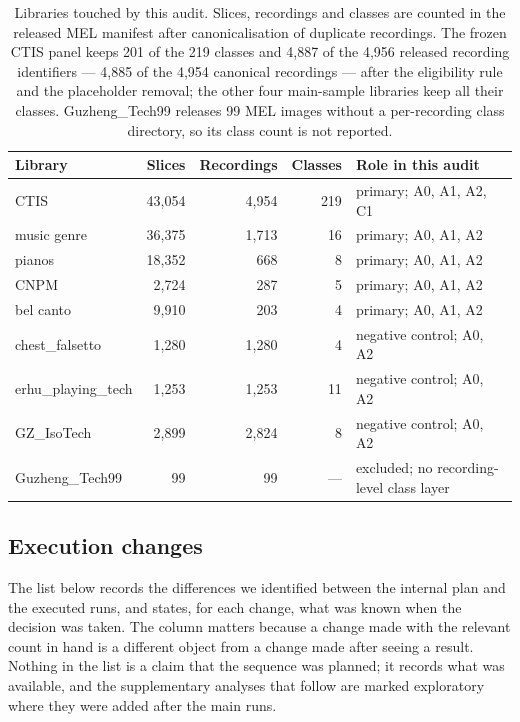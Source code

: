 \begin{table}[ht]\centering\footnotesize\setlength{\tabcolsep}{4pt}
\caption{Libraries touched by this audit. Slices, recordings and classes are counted in the released MEL
manifest after canonicalisation of duplicate recordings. The frozen CTIS panel keeps 201 of the 219
classes and 4{,}887 of the 4{,}956 released recording identifiers --- 4{,}885 of the 4{,}954 canonical
recordings --- after the eligibility rule and the placeholder removal;
the other four main-sample libraries keep all their classes. Guzheng\_Tech99 releases 99 MEL images
without a per-recording class directory, so its class count is not reported.}
\label{tab:libraries}
\begin{tabular}{@{}lrrrl@{}}\toprule
Library & Slices & Recordings & Classes & Role in this audit\\\midrule
CTIS & 43{,}054 & 4{,}954 & 219 & primary; A0, A1, A2, C1\\
music genre & 36{,}375 & 1{,}713 & 16 & primary; A0, A1, A2\\
pianos & 18{,}352 & 668 & 8 & primary; A0, A1, A2\\
CNPM & 2{,}724 & 287 & 5 & primary; A0, A1, A2\\
bel canto & 9{,}910 & 203 & 4 & primary; A0, A1, A2\\
chest\_falsetto & 1{,}280 & 1{,}280 & 4 & negative control; A0, A2\\
erhu\_playing\_tech & 1{,}253 & 1{,}253 & 11 & negative control; A0, A2\\
GZ\_IsoTech & 2{,}899 & 2{,}824 & 8 & negative control; A0, A2\\
Guzheng\_Tech99 & 99 & 99 & --- & excluded; no recording-level class layer\\
\bottomrule\end{tabular}\end{table}

\subsection{Execution changes}

The list below records the differences we identified between the internal plan and the executed
runs, and states, for each change, what was known when the decision was taken. The column matters because a change made with the relevant count in hand is a different
object from a change made after seeing a result. Nothing in the list is a claim that the
sequence was planned; it records what was available, and the supplementary analyses that follow
are marked exploratory where they were added after the main runs.

